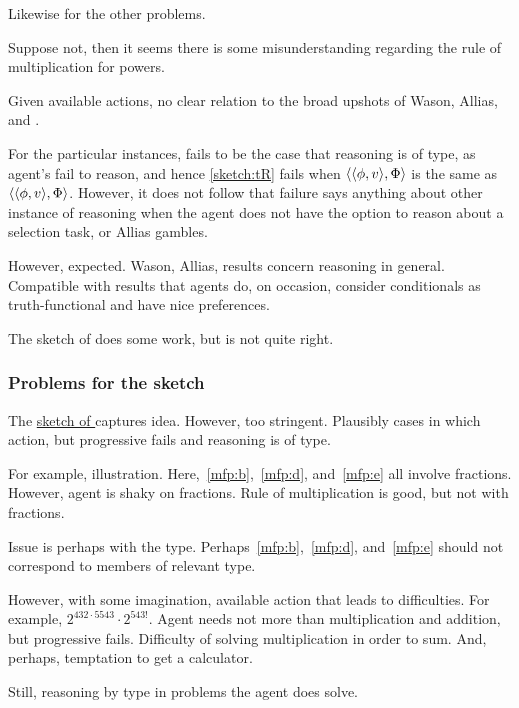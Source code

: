 \begin{note}
\begin{illustration}[Textbook]
    Likewise for the other problems.
  \end{illustration}

  Suppose not, then it seems there is some misunderstanding regarding the rule of multiplication for powers.
\end{note}

\begin{note}
  Given available actions, no clear relation to the broad upshots of Wason, Allias, and \citeauthor{Harman:1984aa}.

  For the particular instances, fails to be the case that reasoning is of type, as agent's fail to reason, and hence \autoref{sketch:tR} fails when \(\langle \langle \phi, v \rangle, \Phi \rangle\) is the same as \(\langle \langle \phi, v \rangle, \Phi \rangle\).
  However, it does not follow that failure says anything about other instance of reasoning when the agent does not have the option to reason about a selection task, or Allias gambles.

  However, expected.
  Wason, Allias, results concern reasoning in general.
  Compatible with results that agents do, on occasion, consider conditionals as truth-functional and have nice preferences.
\end{note}

\begin{note}
  The sketch of \tRN{} does some work, but is not quite right.
\end{note}


\subsubsection{Problems for the sketch}
\label{cha:typical:sec:tor:g-s:three-problems}
\nocite{Wilson:1994aa}

\begin{note}
  The \hyperref[sketch:tR]{sketch of \tRN{}} captures idea.
  However, too stringent.
  Plausibly cases in which action, but progressive fails and reasoning is of type.
\end{note}

\begin{note}
  For example, illustration.
  Here,~\ref{mfp:b},~\ref{mfp:d}, and~\ref{mfp:e} all involve fractions.
  However, agent is shaky on fractions.
  Rule of multiplication is good, but not with fractions.

  Issue is perhaps with the type.
  Perhaps~\ref{mfp:b},~\ref{mfp:d}, and~\ref{mfp:e} should not correspond to members of relevant type.

  However, with some imagination, available action that leads to difficulties.
  For example, \(2^{432 \cdot 5543} \cdot 2^{543!}\).
  Agent needs not more than multiplication and addition, but progressive fails.
  Difficulty of solving multiplication in order to sum.
  And, perhaps, temptation to get a calculator.

  Still, reasoning by type in problems the agent does solve.
\end{note}


